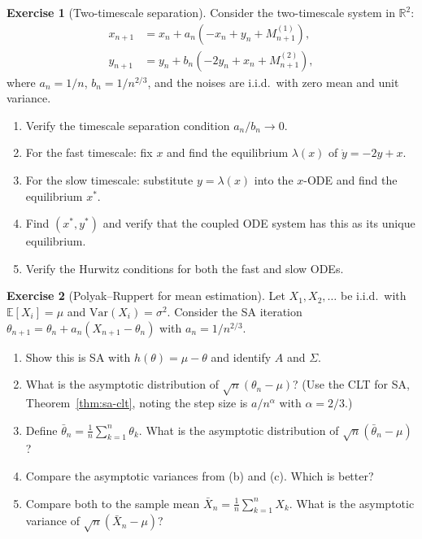 \documentclass[11pt,a4paper]{article}
\theoremstyle{definition}
\newtheorem{exercise}{Exercise}[section]
\theoremstyle{plain}
\theoremstyle{remark}
\newcommand{\R}{\mathbb{R}}
\newcommand{\E}{\mathbb{E}}
\newcommand{\Var}{\mathrm{Var}}
\begin{document}
\begin{exercise}[Two-timescale separation]
\label{ex:two-timescale}
Consider the two-timescale system in $\R^2$:
\begin{align*}
  x_{n+1} &= x_n + a_n(-x_n + y_n + M_{n+1}^{(1)}), \\
  y_{n+1} &= y_n + b_n(-2y_n + x_n + M_{n+1}^{(2)}),
\end{align*}
where $a_n = 1/n$, $b_n = 1/n^{2/3}$, and the noises are i.i.d.\ with zero mean
and unit variance.
\begin{enumerate}[label=(\alph*)]
\item Verify the timescale separation condition $a_n/b_n \to 0$.
\item For the fast timescale: fix $x$ and find the equilibrium $\lambda(x)$
  of $\dot{y} = -2y + x$.
\item For the slow timescale: substitute $y = \lambda(x)$ into the $x$-ODE and
  find the equilibrium $x^*$.
\item Find $(x^*, y^*)$ and verify that the coupled ODE system has this as its
  unique equilibrium.
\item Verify the Hurwitz conditions for both the fast and slow ODEs.
\end{enumerate}
\end{exercise}

\begin{exercise}[Polyak--Ruppert for mean estimation]
\label{ex:polyak-ruppert}
Let $X_1, X_2, \ldots$ be i.i.d.\ with $\E[X_i] = \mu$ and $\Var(X_i) = \sigma^2$.
Consider the SA iteration $\theta_{n+1} = \theta_n + a_n(X_{n+1} - \theta_n)$ with
$a_n = 1/n^{2/3}$.
\begin{enumerate}[label=(\alph*)]
\item Show this is SA with $h(\theta) = \mu - \theta$ and identify $A$ and $\Sigma$.
\item What is the asymptotic distribution of $\sqrt{n}(\theta_n - \mu)$?
  (Use the CLT for SA, Theorem~\ref{thm:sa-clt}, noting the step size is $a/n^\alpha$
  with $\alpha = 2/3$.)
\item Define $\bar{\theta}_n = \frac{1}{n}\sum_{k=1}^n \theta_k$. What is the
  asymptotic distribution of $\sqrt{n}(\bar{\theta}_n - \mu)$?
\item Compare the asymptotic variances from (b) and (c). Which is better?
\item Compare both to the sample mean $\bar{X}_n = \frac{1}{n}\sum_{k=1}^n X_k$.
  What is the asymptotic variance of $\sqrt{n}(\bar{X}_n - \mu)$?
\end{enumerate}
\end{exercise}
\end{document}
